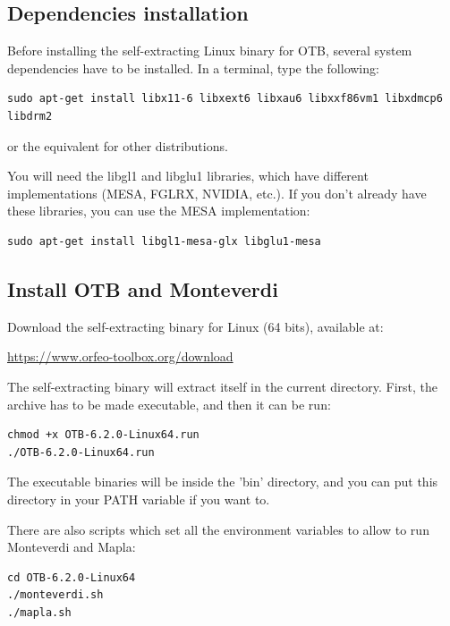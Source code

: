 \documentclass[10pt,a4paper]{article}
\begin{document}
\subsection{Dependencies installation}
Before installing the self-extracting Linux binary for OTB, several system dependencies have to be installed. In a terminal, type the following:
\begin{verbatim}
sudo apt-get install libx11-6 libxext6 libxau6 libxxf86vm1 libxdmcp6 libdrm2
\end{verbatim}
or the equivalent for other distributions.

You will need the libgl1 and libglu1 libraries, which have different implementations (MESA, FGLRX, NVIDIA, etc.). If you don't already have these libraries, you can use the MESA implementation:
\begin{verbatim}
sudo apt-get install libgl1-mesa-glx libglu1-mesa
\end{verbatim}

\subsection{Install OTB and Monteverdi}
Download the self-extracting binary for Linux (64 bits), available at:
\begin{center}
\url{https://www.orfeo-toolbox.org/download}
\end{center}

The self-extracting binary will extract itself in the current directory. First, the archive has to be made executable, and then it can be run:
\begin{verbatim}
chmod +x OTB-6.2.0-Linux64.run
./OTB-6.2.0-Linux64.run
\end{verbatim}

The executable binaries will be inside the 'bin' directory, and you can put this directory in your PATH variable if you want to. 

There are also scripts which set all the environment variables to allow to run Monteverdi and Mapla:
\begin{verbatim}
cd OTB-6.2.0-Linux64
./monteverdi.sh
./mapla.sh
\end{verbatim}
\end{document}
